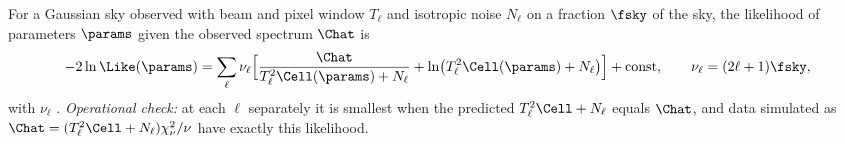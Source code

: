 \begin{workdef}
For a Gaussian sky observed with beam and pixel window $T_\ell$ and isotropic noise $N_\ell$ on a fraction $\fsky$ of the
sky, the likelihood of parameters $\params$ given the observed spectrum $\Chat$ is
\[
  -2\ln\Like(\params)=\sum_\ell\nu_\ell\Bigl[\frac{\Chat}{T_\ell^2\Cell(\params)+N_\ell}+\ln\bigl(T_\ell^2\Cell(\params)+N_\ell\bigr)\Bigr]+\text{const},
  \qquad \nu_\ell=(2\ell+1)\fsky ,
\]
with $\nu_\ell$ .
\emph{Operational check:} at each $\ell$ separately it is smallest when the predicted $T^2_\ell\Cell+N_\ell$ equals $\Chat$, and
data simulated as $\Chat=(T_\ell^2\Cell+N_\ell)\chi^2_{\nu}/\nu$ have exactly this likelihood.
\end{workdef}

